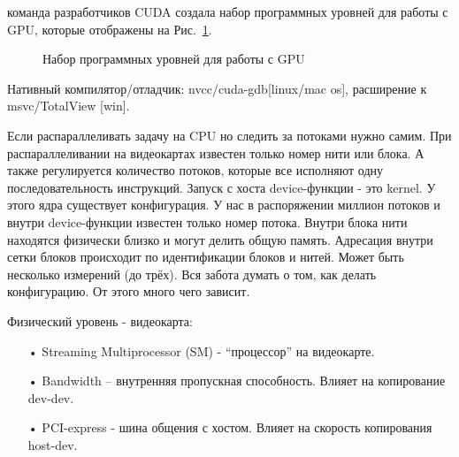 \documentclass[a4paper,14pt,russian]{extreport}
\begin{document}
\par
команда разработчиков CUDA  создала набор программных уровней для работы с GPU, которые отображены на Рис.~\ref{ris:cuda_levels}.
\par
\begin{figure}[h]
\caption{Набор программных уровней для работы с GPU}
\label{ris:cuda_levels}
\end{figure}
\par
Нативный компилятор/отладчик: nvcc/cuda-gdb[linux/mac os], расширение к msvc/TotalView [win].
\par
Если распараллеливать задачу на CPU но следить за потоками нужно самим. При распараллеливании на видеокартах известен только номер нити или блока. А также регулируется количество потоков, которые все исполняют одну последовательность инструкций. Запуск с хоста device-функции - это kernel. У этого ядра существует конфигурация. У нас в распоряжении миллион потоков и внутри device-функции известен только номер потока. Внутри блока нити находятся физически близко и могут делить общую память. Адресация внутри сетки блоков происходит по идентификации блоков и нитей. Может быть несколько измерений (до трёх). Вся забота думать о том, как делать конфигурацию. От этого много чего зависит.
\par
Физический уровень - видеокарта:
\begin{itemize}
\item[•] Streaming Multiprocessor (SM) - “процессор” на видеокарте.
\item[•] Bandwidth – внутренняя пропускная способность. Влияет на копирование dev-dev.
\item[•] PCI-express - шина общения с хостом. Влияет на скорость копирования host-dev.
\end{itemize}
\end{document}
